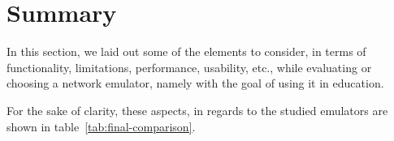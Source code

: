 \section{Summary}
\label{sec:comparativesummary}

In this section, we laid out some of the elements to consider, in terms of functionality, limitations, performance, usability, etc., while evaluating or choosing a network emulator, namely with the goal of using it in education.

For the sake of clarity, these aspects, in regards to the studied emulators are shown in table~\ref{tab:final-comparison}.




